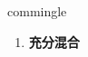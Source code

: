 
\begin{frame}
{\huge commingle}
\begin{center}
\begin{enumerate}\Large
  \item \textbf{充分混合}
\end{enumerate}
\end{center}
\end{frame}

